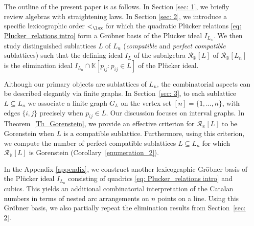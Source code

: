 \documentclass[12pt,a4paper]{amsart}
\def\Rc{{\mathcal R}}
\theoremstyle{definition}
\begin{document}
The outline of the present paper is as follows. In Section \ref{sec: 1}, we briefly review algebras with straightening laws. In Section \ref{sec: 2}, we introduce a specific lexicographic order $<_{\lex}$ for which the quadratic Plücker relations \eqref{eq: Plucker_relations intro} form a Gröbner basis of the Plücker ideal $I_{L_n}$. We then study distinguished sublattices $L$ of $L_n$ (\emph{compatible} and \emph{perfect compatible} sublattices)  such that the defining ideal $I_L$ of the subalgebra $\Rc_\mathbb{K}[L]$ of $\Rc_\mathbb{K}[L_n]$ is the elimination ideal $I_{L_n} \cap \mathbb{K}[p_{ij} : p_{ij} \in L]$ of the Pl\"ucker ideal.  

Although our primary objects are sublattices of $L_n$, the combinatorial aspects can be described elegantly via finite graphs. In Section~\ref{sec: 3}, to each sublattice $L \subseteq L_n$ we associate a finite graph $G_L$ on the vertex set $[n]=\{1,\ldots,n\}$, with edges $\{i,j\}$ precisely when $p_{ij} \in L$. Our discussion focuses on interval graphs. In Theorem~\ref{Th_Gorenstein}, we provide an effective criterion for $\Rc_{\mathbb{K}}[L]$ to be Gorenstein when $L$ is a compatible sublattice. Furthermore, using this criterion, we compute the number of perfect compatible sublattices $L \subseteq L_n$ for which $\Rc_{\mathbb{K}}[L]$ is Gorenstein (Corollary~\ref{enumeration_2}).

In the Appendix \ref{appendix}, we construct another lexicographic Gröbner basis of the Plücker ideal \(I_{L_n}\) consisting of quadrics \eqref{eq: Plucker_relations intro} and cubics. This yields an additional combinatorial interpretation of the Catalan numbers in terms of nested arc arrangements on \(n\) points on a line. Using this Gröbner basis, we also partially repeat  the elimination results from Section~\ref{sec: 2}.
\end{document}
